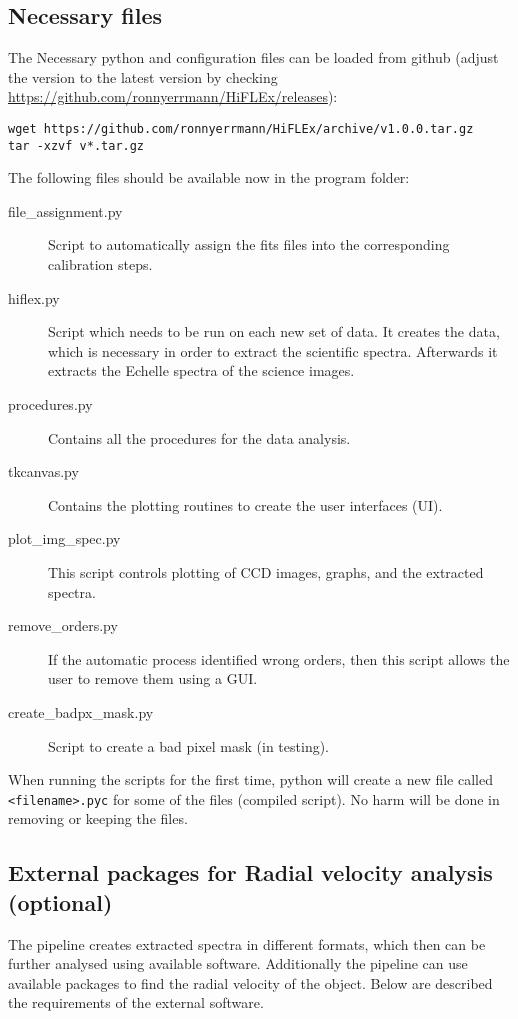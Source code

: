 \documentclass[10pt,a4paper]{article}
\begin{document}
\subsection{Necessary files}

\noindent The Necessary python and configuration files can be loaded from github (adjust the version to the latest version by checking \url{https://github.com/ronnyerrmann/HiFLEx/releases}):
\begin{lstlisting}[style=base]
wget https://github.com/ronnyerrmann/HiFLEx/archive/v1.0.0.tar.gz
tar -xzvf v*.tar.gz
\end{lstlisting}

\noindent The following files should be available now in the program folder:
\begin{description}
 \item[file\_assignment.py] Script to automatically assign the fits files into the corresponding calibration steps.
 \item[hiflex.py] Script which needs to be run on each new set of data. It creates the data, which is necessary in order to extract the scientific spectra. Afterwards it extracts the Echelle spectra of the science images.
 \item[procedures.py] Contains all the procedures for the data analysis.
 \item[tkcanvas.py] Contains the plotting routines to create the user interfaces (UI).
 \item[plot\_img\_spec.py] This script controls plotting of CCD images, graphs, and the extracted spectra.
 \item[remove\_orders.py] If the automatic process identified wrong orders, then this script allows the user to remove them using a GUI.
 \item[create\_badpx\_mask.py] Script to create a bad pixel mask (in testing).
\end{description}

When running the scripts for the first time, python will create a new file called \verb|<filename>.pyc| for some of the files (compiled script). No harm will be done in removing or keeping the files.

\subsection{External packages for Radial velocity analysis (optional)}
The pipeline creates extracted spectra in different formats, which then can be further analysed using available software. Additionally the pipeline can use available packages to find the radial velocity of the object. Below are described the requirements of the external software.
\end{document}
